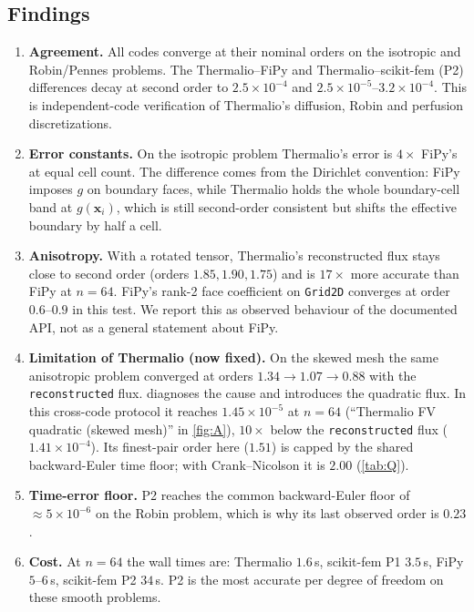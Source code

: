 \documentclass[11pt]{article}
\numberwithin{equation}{section}
\theoremstyle{remark}
\begin{document}
\subsection{Findings}

\begin{enumerate}[leftmargin=*]
\item \textbf{Agreement.}  All codes converge at their nominal orders on the
  isotropic and Robin/Pennes problems.  The Thermalio--FiPy and
  Thermalio--scikit-fem (P2) differences decay at second order to
  $2.5\times10^{-4}$ and $2.5\times10^{-5}$--$3.2\times10^{-4}$.  This is
  independent-code verification of Thermalio's diffusion, Robin and perfusion
  discretizations.
\item \textbf{Error constants.}  On the isotropic problem Thermalio's error is
  $4\times$ FiPy's at equal cell count.  The difference comes from the Dirichlet
  convention: FiPy imposes $g$ on boundary faces, while Thermalio holds the whole
  boundary-cell band at $g(\bm x_i)$, which is still second-order consistent but
  shifts the effective boundary by half a cell.
\item \textbf{Anisotropy.}  With a rotated tensor, Thermalio's reconstructed
  flux stays close to second order (orders $1.85, 1.90, 1.75$) and is $17\times$
  more accurate than FiPy at $n=64$.  FiPy's rank-2 face coefficient on
  \texttt{Grid2D} converges at order $0.6$--$0.9$ in this test.  We report this as
  observed behaviour of the documented API, not as a general statement about FiPy.
\item \textbf{Limitation of Thermalio (now fixed).}  On the skewed mesh the same
  anisotropic problem converged at orders $1.34\to1.07\to0.88$ with the
  \texttt{reconstructed} flux.   diagnoses the cause and
  introduces the quadratic flux.  In this cross-code protocol it reaches
  $1.45\times10^{-5}$ at $n=64$ (``Thermalio FV quadratic (skewed mesh)'' in
  \cref{fig:A}), $10\times$ below the \texttt{reconstructed} flux
  ($1.41\times10^{-4}$).  Its finest-pair order here ($1.51$) is capped by the
  shared backward-Euler time floor; with Crank--Nicolson it is $2.00$
  (\cref{tab:Q}).
\item \textbf{Time-error floor.}  P2 reaches the common backward-Euler floor of
  $\approx5\times10^{-6}$ on the Robin problem, which is why its last observed order is
  $0.23$.
\item \textbf{Cost.}  At $n=64$ the wall times are: Thermalio $1.6$\,s,
  scikit-fem P1 $3.5$\,s, FiPy $5$--$6$\,s, scikit-fem P2 $34$\,s.  P2 is the
  most accurate per degree of freedom on these smooth problems.
\end{enumerate}
\end{document}
